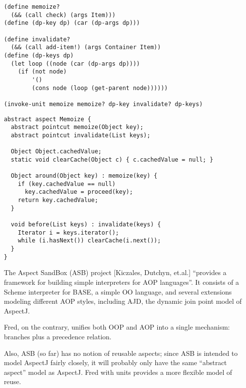 \documentclass[landscape]{slides}
\begin{document}
\begin{slide}
\begin{verbatim}
(define memoize?
  (&& (call check) (args Item)))
(define (dp-key dp) (car (dp-args dp)))

(define invalidate?
  (&& (call add-item!) (args Container Item))
(define (dp-keys dp)
  (let loop ((node (car (dp-args dp))))
    (if (not node)
        '()
        (cons node (loop (get-parent node))))))

(invoke-unit memoize memoize? dp-key invalidate? dp-keys)
\end{verbatim}
\end{slide}

\begin{slide}
\small
\begin{verbatim}
abstract aspect Memoize {
  abstract pointcut memoize(Object key);
  abstract pointcut invalidate(List keys);

  Object Object.cachedValue;
  static void clearCache(Object c) { c.cachedValue = null; }

  Object around(Object key) : memoize(key) {
    if (key.cachedValue == null)
      key.cachedValue = proceed(key);
    return key.cachedValue;
  }

  void before(List keys) : invalidate(keys) {
    Iterator i = keys.iterator();
    while (i.hasNext()) clearCache(i.next());
  }
}
\end{verbatim}
\end{slide}

\begin{slide}
The Aspect SandBox (ASB) project [Kiczales, Dutchyn, et.al.]
``provides a framework for building simple interpreters for AOP
languages''.  It consists of a Scheme interpreter for BASE, a simple
OO language, and several extensions modeling different AOP styles,
including AJD, the dynamic join point model of AspectJ.

Fred, on the contrary, unifies both OOP and AOP into a single
mechanism: branches plus a precedence relation.

Also, ASB (so far) has no notion of reusable aspects; since ASB is
intended to model AspectJ fairly closely, it will probably only have
the same ``abstract aspect'' model as AspectJ.  Fred with units
provides a more flexible model of reuse.
\end{slide}
\end{document}

